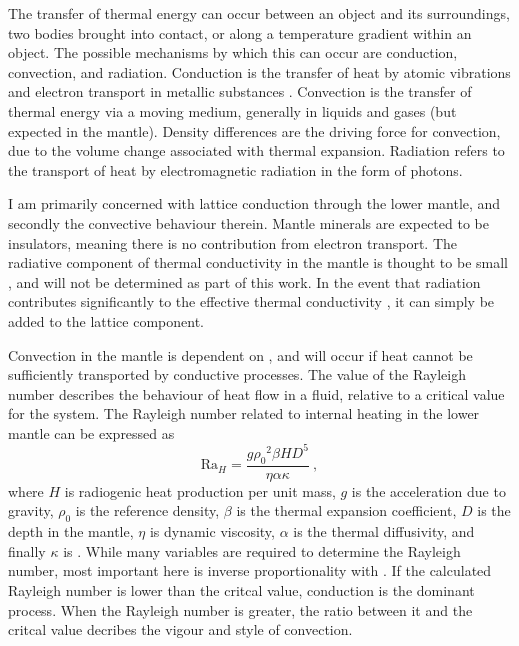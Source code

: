 The transfer of thermal energy can occur between an object and its surroundings, two bodies brought into contact, or along a temperature gradient within an object. The possible mechanisms by which this can occur are conduction, convection, and radiation. Conduction is the transfer of heat by atomic vibrations and electron transport in metallic substances \citep[such as in the outer core, e.g.][]{Pozzo2012}. Convection is the transfer of thermal energy via a moving medium, generally in liquids and gases (but expected in the mantle). Density differences are the driving force for convection, due to the volume change associated with thermal expansion. Radiation refers to the transport of heat by electromagnetic radiation in the form of photons.

I am primarily concerned with lattice conduction through the lower mantle, and secondly the convective behaviour therein. Mantle minerals are expected to be insulators, meaning there is no contribution from electron transport. The radiative component of thermal conductivity in the mantle is thought to be small \citep{Goncharov2008}, and will not be determined as part of this work. In the event that radiation contributes significantly to the effective thermal conductivity \citep{Keppler2008}, it can simply be added to the lattice component.

Convection in the mantle is dependent on \tc, and will occur if heat cannot be sufficiently transported by conductive processes. The value of the Rayleigh number describes the behaviour of heat flow in a fluid, relative to a critical value for the system. The Rayleigh number related to internal heating in the lower mantle can be expressed as
%
\begin{equation}
\mathrm{Ra}_{H} = \frac{g {\rho_{0}}^{2} \beta H D^5}{\eta \alpha \kappa}\ ,
\label{eq:rayleigh}
\end{equation}
%
where $H$ is radiogenic heat production per unit mass, $g$ is the acceleration due to gravity, $\rho_{0}$ is the reference density, $\beta$ is the thermal expansion coefficient, $D$ is the depth in the mantle, $\eta$ is dynamic viscosity, $\alpha$ is the thermal diffusivity, and finally $\kappa$ is \tc.
While many variables are required to determine the Rayleigh number, most important here is inverse proportionality with \tc. If the calculated Rayleigh number is lower than the critcal value, conduction is the dominant process. When the Rayleigh number is greater, the ratio between it and the critcal value decribes the vigour and style of convection.




